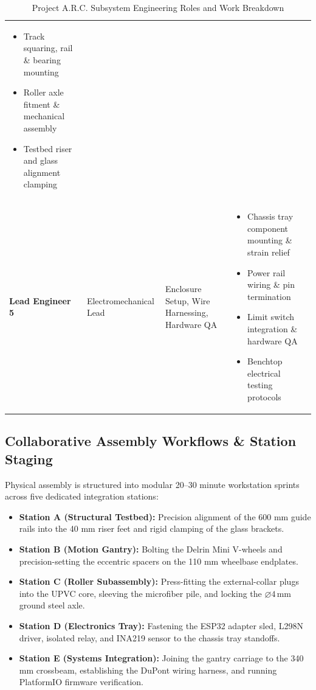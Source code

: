 \documentclass[10pt,a4paper]{article}
\begin{document}
\begin{table}[H]
\begin{tabularx}{\textwidth}{p{3.5cm} p{3.5cm} p{4.2cm} X}
\begin{itemize}[leftmargin=*, nosep]
    \item Track squaring, rail \& bearing mounting
    \item Roller axle fitment \& mechanical assembly
    \item Testbed riser and glass alignment clamping
\end{itemize} \\
\addlinespace[0.4em]
\textbf{Lead Engineer 5} & Electromechanical Lead & Enclosure Setup, Wire Harnessing, Hardware QA & 
\begin{itemize}[leftmargin=*, nosep]
    \item Chassis tray component mounting \& strain relief
    \item Power rail wiring \& pin termination
    \item Limit switch integration \& hardware QA
    \item Benchtop electrical testing protocols
\end{itemize} \\
\bottomrule
\end{tabularx}
\caption{Project A.R.C. Subsystem Engineering Roles and Work Breakdown}
\label{tab:team_structure}
\end{table}

\subsection{Collaborative Assembly Workflows \& Station Staging}
Physical assembly is structured into modular 20--30 minute workstation sprints across five dedicated integration stations:
\begin{itemize}[leftmargin=*]
    \item \textbf{Station A (Structural Testbed):} Precision alignment of the 600 mm guide rails into the 40 mm riser feet and rigid clamping of the glass brackets.
    \item \textbf{Station B (Motion Gantry):} Bolting the Delrin Mini V-wheels and precision-setting the eccentric spacers on the 110 mm wheelbase endplates.
    \item \textbf{Station C (Roller Subassembly):} Press-fitting the external-collar plugs into the UPVC core, sleeving the microfiber pile, and locking the $\varnothing 4\,\text{mm}$ ground steel axle.
    \item \textbf{Station D (Electronics Tray):} Fastening the ESP32 adapter sled, L298N driver, isolated relay, and INA219 sensor to the chassis tray standoffs.
    \item \textbf{Station E (Systems Integration):} Joining the gantry carriage to the 340 mm crossbeam, establishing the DuPont wiring harness, and running PlatformIO firmware verification.
\end{itemize}
\end{document}
